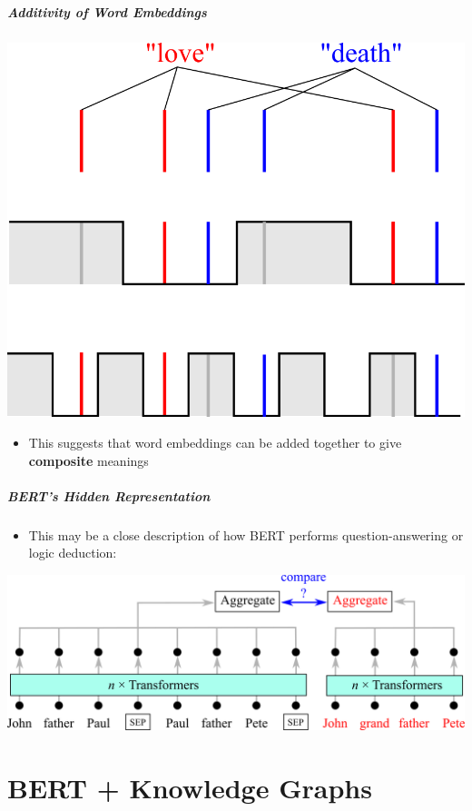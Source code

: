 \documentclass[16pt]{beamer}
\begin{document}
\begin{frame}
\frametitle{Additivity of Word Embeddings}
\centering
\includegraphics[scale=0.5]{positional-encoding.png}
\vspace*{1em}
\begin{itemize}
	\item This suggests that word embeddings can be added together to give \textbf{composite} meanings
\end{itemize}
\end{frame}

\begin{frame}
\frametitle{BERT's Hidden Representation}
\begin{itemize}
	\item This may be a close description of how BERT performs question-answering or logic deduction:
\end{itemize}
\vspace*{1em}
\centering
\includegraphics[scale=0.7]{Transformer-QnA.png}
\end{frame}

\part{BERT + Knowledge Graphs}
\frame{\partpage}
\end{document}
